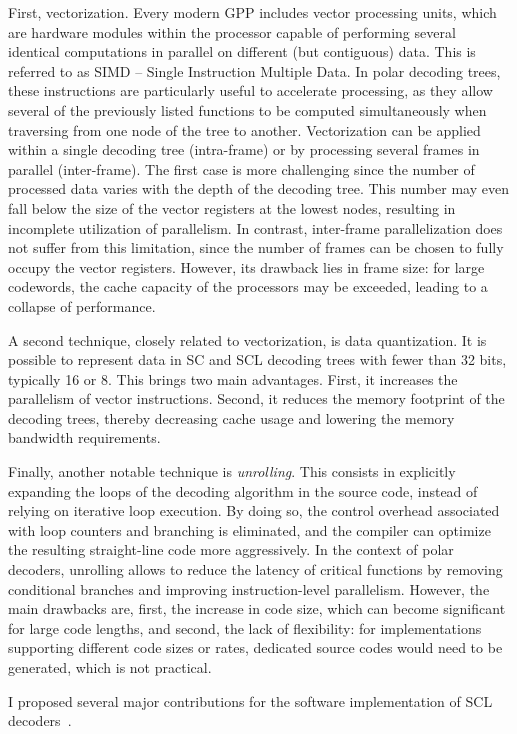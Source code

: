 \documentclass[11pt]{report}
\begin{document}
First, vectorization. Every modern GPP includes vector processing units, which are hardware modules within the processor capable of performing several identical computations in parallel on different (but contiguous) data. This is referred to as SIMD – Single Instruction Multiple Data. In polar decoding trees, these instructions are particularly useful to accelerate processing, as they allow several of the previously listed functions to be computed simultaneously when traversing from one node of the tree to another. Vectorization can be applied within a single decoding tree (intra-frame) or by processing several frames in parallel (inter-frame). The first case is more challenging since the number of processed data varies with the depth of the decoding tree. This number may even fall below the size of the vector registers at the lowest nodes, resulting in incomplete utilization of parallelism. In contrast, inter-frame parallelization does not suffer from this limitation, since the number of frames can be chosen to fully occupy the vector registers. However, its drawback lies in frame size: for large codewords, the cache capacity of the processors may be exceeded, leading to a collapse of performance.

A second technique, closely related to vectorization, is data quantization. It is possible to represent data in SC and SCL decoding trees with fewer than 32 bits, typically 16 or 8. This brings two main advantages. First, it increases the parallelism of vector instructions. Second, it reduces the memory footprint of the decoding trees, thereby decreasing cache usage and lowering the memory bandwidth requirements.

Finally, another notable technique is \emph{unrolling}. This consists in explicitly expanding the loops of the decoding algorithm in the source code, instead of relying on iterative loop execution. By doing so, the control overhead associated with loop counters and branching is eliminated, and the compiler can optimize the resulting straight-line code more aggressively. In the context of polar decoders, unrolling allows to reduce the latency of critical functions by removing conditional branches and improving instruction-level parallelism. However, the main drawbacks are, first, the increase in code size, which can become significant for large code lengths, and second, the lack of flexibility: for implementations supporting different code sizes or rates, dedicated source codes would need to be generated, which is not practical.


I proposed several major contributions for the software implementation of SCL decoders~\cite{leonardon:hal-01987848}.
\end{document}
